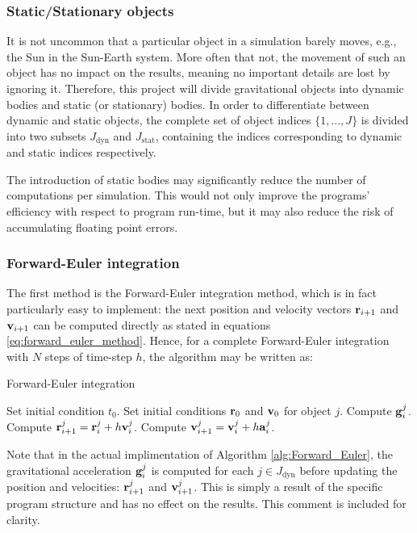 \documentclass[reprint,english]{revtex4-1}
\begin{document}
\subsubsection{Static/Stationary objects}
It is not uncommon that a particular object in a simulation barely moves, e.g., the Sun in the Sun-Earth system. More often that not, the movement of such an object has no impact on the results, meaning no important details are lost by ignoring it. Therefore, this project will divide gravitational objects into dynamic bodies and static (or stationary) bodies. In order to differentiate between dynamic and static objects, the complete set of object indices \(\{1,\ldots,J\}\) is divided into two subsets \(J_\text{dyn}\) and \(J_\text{stat}\), containing the indices corresponding to dynamic and static indices respectively.

The introduction of static bodies may significantly reduce the number of computations per simulation. This would not only improve the programs' efficiency with respect to program run-time, but it may also reduce the risk of accumulating floating point errors.
\subsubsection{Forward-Euler integration}
The first method is the Forward-Euler integration method, which is in fact particularly easy to implement: the next position and velocity vectors \(\vb{r}_{i+1}\) and \(\vb{v}_{i+1}\) can be computed directly as stated in equations \eqref{eq:forward_euler_method}. Hence, for a complete Forward-Euler integration with \(N\) steps of time-step \(h\), the algorithm may be written as:
\begin{algorithm}[H]
\caption{Forward-Euler integration}\label{alg:Forward_Euler}
\begin{algorithmic}[1]
\State Set initial condition \(t_0\).
	\State Set initial conditions \(\vb{r}_0\) and \(\vb{v}_0\) for object \(j\).
\EndFor
{}
		\State Compute \(\vb{g}_i^j\).
		\State Compute \(\vb{r}_{i+1}^j=\vb{r}_i^j+h\vb{v}_i^j\).
		\State Compute \(\vb{v}_{i+1}^j=\vb{v}_i^j+h\vb{a}_i^j\).
	\EndFor
\EndFor
\end{algorithmic}
\end{algorithm}
Note that in the actual implimentation of Algorithm \ref{alg:Forward_Euler}, the gravitational acceleration \(\vb{g}_i^j\) is computed for each \(j\in J_\text{dyn}\) before updating the position and velocities: \(\vb{r}_{i+1}^j\) and \(\vb{v}_{i+1}^j\). This is simply a result of the specific program structure and has no effect on the results. This comment is included for clarity.
\end{document}
